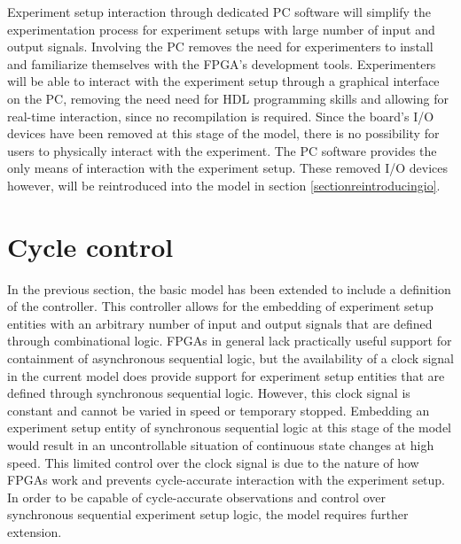 \documentclass[openright]{template/uva-bachelor-thesis}
\begin{document}
Experiment setup interaction through dedicated PC software will simplify the experimentation process for experiment setups with large number of input and output signals. Involving the PC removes the need for experimenters to install and familiarize themselves with the FPGA's development tools. Experimenters will be able to interact with the experiment setup through a graphical interface on the PC, removing the need need for HDL programming skills and allowing for real-time interaction, since no recompilation is required. Since the board's I/O devices have been removed at this stage of the model, there is no possibility for users to physically interact with the experiment. The PC software provides the only means of interaction with the experiment setup. These removed I/O devices however, will be reintroduced into the model in section \ref{sectionreintroducingio}.




\section{Cycle control}



\label{sectioncyclecontrol}
In the previous section, the basic model has been extended to include a definition of the controller. This controller allows for the embedding of experiment setup entities with an arbitrary number of input and output signals that are defined through combinational logic. FPGAs in general lack practically useful support for containment of asynchronous sequential logic, but the availability of a clock signal in the current model does provide support for experiment setup entities that are defined through synchronous sequential logic. However, this clock signal is constant and cannot be varied in speed or temporary stopped. Embedding an experiment setup entity of synchronous sequential logic at this stage of the model would result in an uncontrollable situation of continuous state changes at high speed. This limited control over the clock signal is due to the nature of how FPGAs work and prevents cycle-accurate interaction with the experiment setup. In order to be capable of cycle-accurate observations and control over synchronous sequential experiment setup logic, the model requires further extension.
\end{document}
